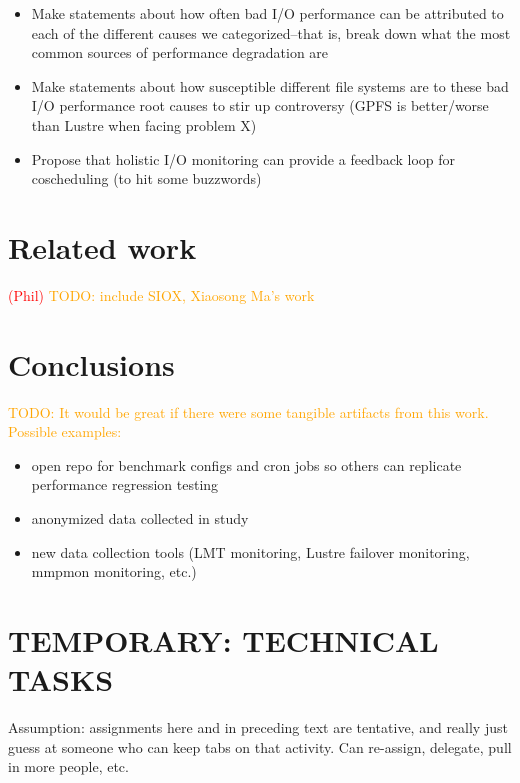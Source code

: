 \documentclass[conference,10pt,compsocconf]{IEEEtran}
\newcommand{\assign}[1]{\textcolor{red}{(#1)}}
\newcommand{\todo}[1]{\textcolor{Orange}{TODO: #1}}
\begin{document}
\begin{itemize}
\item Make statements about how often bad I/O performance can be attributed to each
of the different causes we categorized--that is, break down what the most
common sources of performance degradation are
\item Make statements about how susceptible different file systems are to these bad
I/O performance root causes to stir up controversy (GPFS is better/worse than
Lustre when facing problem X)
\item Propose that holistic I/O monitoring can provide a feedback loop for
coscheduling (to hit some buzzwords)
\end{itemize}

\section{Related work}

\assign{Phil} \todo{include SIOX, Xiaosong Ma's work}

\section{Conclusions}

\todo{It would be great if there were some tangible artifacts from this work.
Possible examples:}
\begin{itemize}
\item open repo for benchmark configs and cron jobs so others can replicate
performance regression testing
\item anonymized data collected in study
\item new data collection tools (LMT monitoring, Lustre failover monitoring,
mmpmon monitoring, etc.)
\end{itemize}

\section{TEMPORARY: TECHNICAL TASKS}

Assumption: assignments here and in preceding text are tentative, and really
just guess at someone who can keep tabs on that activity.  Can re-assign,
delegate, pull in more people, etc.
\end{document}
